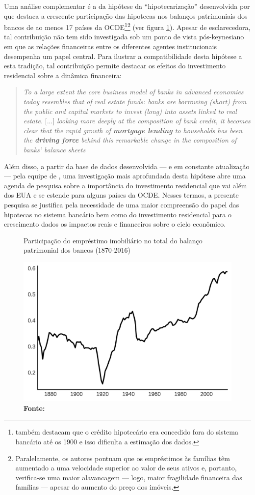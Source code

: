 Uma análise complementar é a da hipótese da ``hipotecarização'' desenvolvida por \textcite{jorda_great_2014} que destaca a crescente participação das hipotecas nos balanços patrimoniais dos bancos de ao menos 17 países da OCDE\footnote{\textcite{jorda_great_2014} também destacam que o crédito hipotecário era concedido fora do sistema bancário até os 1900 e isso dificulta a estimação dos dados.}\footnote{Paralelamente, os autores pontuam que os empréstimos às famílias têm aumentado a uma velocidade superior ao valor de seus ativos e, portanto, verifica-se uma maior alavancagem --- logo, maior fragilidade financeira das famílias --- apesar do aumento do preço dos imóveis.} (ver figura \ref{GraficoJorda}).
Apesar de esclarecedora, tal contribuição não tem sido investigada sob um ponto de vista pós-keynesiano em que as relações financeiras entre os diferentes agentes institucionais desempenha um papel central. Para ilustrar a compatibilidade desta hipótese a esta tradição, tal contribuição permite destacar os efeitos do investimento residencial sobre a dinâmica financeira: 

\begin{quote}
	\textit{To a large extent the core business model of banks in advanced economies today resembles that of real estate funds: banks are borrowing (short) from the public and capital markets to invest (long) into assets linked to real estate.} [...] \textit{looking more deeply at the composition of bank credit, it becomes clear that the rapid growth of \textbf{mortgage lending} to households has been the \textbf{driving force} behind this remarkable change in the composition of banks’ balance sheets} \cite[p.~2, grifos adicionados]{jorda_great_2014}
\end{quote}
Além disso, a partir da base de dados desenvolvida --- e em constante atualização --- pela equipe de \textcite{jorda_great_2014}, uma investigação mais aprofundada desta hipótese abre uma agenda de pesquisa sobre a importância do investimento residencial que vai além dos EUA e se estende para alguns países da OCDE. Nesses termos, a presente pesquisa se justifica pela necessidade de uma maior compreensão do papel das hipotecas no sistema bancário bem como do investimento residencial para o crescimento dados os impactos reais e financeiros sobre o ciclo econômico.

\begin{figure}
	\centering
	\caption{Participação do empréstimo imobiliário no total do balanço patrimonial dos bancos (1870-2016)}
	\label{GraficoJorda}
	\includegraphics[width=.65\textwidth]{Jorda_Mean.png}
	\caption*{\textbf{Fonte:} \textcite[p.~10]{jorda_great_2014}}
\end{figure}


